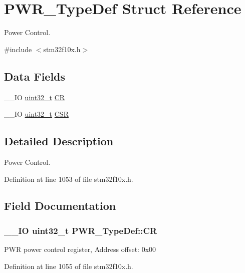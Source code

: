 \hypertarget{struct_p_w_r___type_def}{\section{P\-W\-R\-\_\-\-Type\-Def Struct Reference}
\label{struct_p_w_r___type_def}
}


Power Control.  




{\ttfamily \#include $<$stm32f10x.\-h$>$}

\subsection*{Data Fields}
\begin{DoxyCompactItemize}
\item 
\-\_\-\-\_\-\-I\-O \hyperlink{stdint_8h_a435d1572bf3f880d55459d9805097f62}{uint32\-\_\-t} \hyperlink{struct_p_w_r___type_def_aeb6bcdb2b99d58b9a0ffd86deb606eac}{C\-R}
\item 
\-\_\-\-\_\-\-I\-O \hyperlink{stdint_8h_a435d1572bf3f880d55459d9805097f62}{uint32\-\_\-t} \hyperlink{struct_p_w_r___type_def_ae17097e69c88b6c00033d6fb84a8182b}{C\-S\-R}
\end{DoxyCompactItemize}


\subsection{Detailed Description}
Power Control. 

Definition at line 1053 of file stm32f10x.\-h.



\subsection{Field Documentation}
\hypertarget{struct_p_w_r___type_def_aeb6bcdb2b99d58b9a0ffd86deb606eac}{
\subsubsection[{C\-R}]{\setlength{\rightskip}{0pt plus 5cm}\-\_\-\-\_\-\-I\-O {\bf uint32\-\_\-t} P\-W\-R\-\_\-\-Type\-Def\-::\-C\-R}}\label{struct_p_w_r___type_def_aeb6bcdb2b99d58b9a0ffd86deb606eac}
P\-W\-R power control register, Address offset\-: 0x00 

Definition at line 1055 of file stm32f10x.\-h.


